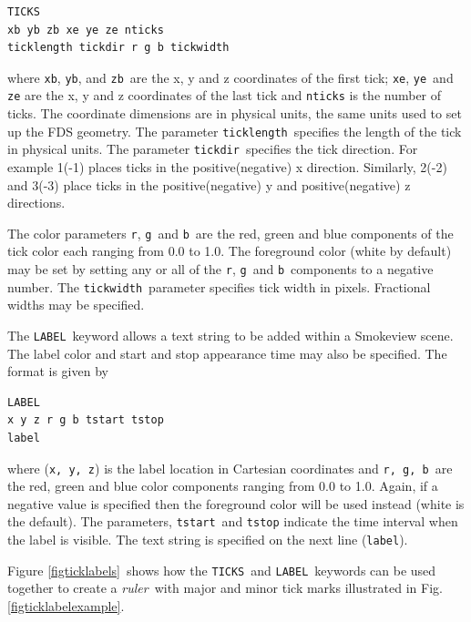 \documentclass[11pt,twoside]{book}
\begin{document}
\begin{lstlisting}
TICKS
xb yb zb xe ye ze nticks
ticklength tickdir r g b tickwidth
\end{lstlisting}

\noindent where {\tt xb}, {\tt yb}, and {\tt zb}\ are the x, y and
z coordinates of the first tick; {\tt xe}, {\tt ye}\ and {\tt ze}
are the x, y and z coordinates of the last tick and {\tt nticks}
is the number of ticks. The coordinate dimensions are in physical
units, the same units used to set up the FDS geometry. The
parameter {\tt ticklength}\ specifies the length of the tick in
physical units. The parameter {\tt tickdir}\ specifies the tick
direction.  For example 1(-1) places ticks in the
positive(negative) x direction. Similarly, 2(-2) and 3(-3) place
ticks in the positive(negative) y and positive(negative) z
directions.

The color parameters {\tt r}, {\tt g}\ and {\tt b}\ are the
red, green and blue components of the tick color each
ranging from 0.0 to 1.0. The foreground color (white by
default) may be set by setting any or all of the {\tt r},
{\tt g}\ and {\tt b}\ components to a negative number. The
{\tt tickwidth}\ parameter specifies tick width in pixels.
Fractional widths may be specified.

The {\tt LABEL}\ keyword allows a text string to be added
within a Smokeview scene.  The label color and start and
stop appearance time may also be specified. The format is
given by

\begin{lstlisting}
LABEL
x y z r g b tstart tstop
label
\end{lstlisting}

\noindent where ({\tt x, y, z}) is the label location in Cartesian
coordinates and {\tt r, g, b}\ are the red, green and blue color
components ranging from 0.0 to 1.0.  Again, if a negative value is
specified then the foreground color will be used instead (white is
the default).  The parameters, {\tt tstart}\ and {\tt tstop}
indicate the time interval when the label is visible. The text
string is specified on the next line ({\tt label}).

Figure \ref{figticklabels}\ shows how the {\tt TICKS}\ and
{\tt LABEL}\ keywords can be used together to create a
{\em ruler}\ with major and minor tick marks illustrated in Fig.
\ref{figticklabelexample}.
\end{document}
